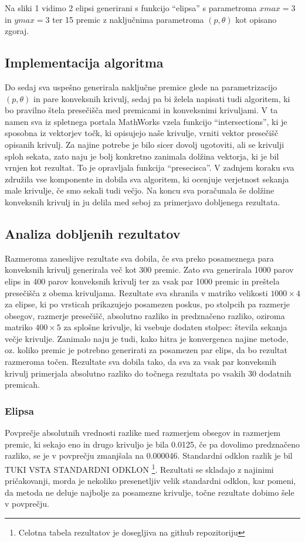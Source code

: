 \documentclass[a4paper]{article}
\begin{document}
Na sliki 1 vidimo 2 elipsi generirani s funkcijo ``elipsa'' s parametroma $xmax=3$ in $ymax=3$ ter 15 premic z naključnima parametroma $(p, \theta)$ kot opisano zgoraj. 


\subsection{Implementacija algoritma}
Do sedaj sva uspešno generirala naključne premice glede na parametrizacijo $(p, \theta)$ in pare konveksnih krivulj, sedaj pa bi želela napisati tudi algoritem, ki bo pravilno štela presečišča med premicami in konveksnimi krivuljami. V ta namen sva iz spletnega portala MathWorks vzela funkcijo ``intersections'', ki je sposobna iz vektorjev točk, ki opisujejo naše krivulje, vrniti vektor presečišč opisanih krivulj. Za najine potrebe je bilo sicer dovolj ugotoviti, ali se krivulji sploh sekata, zato naju je bolj konkretno zanimala dolžina vektorja, ki je bil vrnjen kot rezultat. To je opravljala funkcija ``presecisca''. V zadnjem koraku sva združila vse komponente in dobila sva algoritem, ki ocenjuje verjetnost sekanja male krivulje, če smo sekali tudi večjo. Na koncu sva poračunala še dolžine konveksnih krivulj in ju delila med seboj za primerjavo dobljenega rezultata.

\subsection{Analiza dobljenih rezultatov}
Razmeroma zaneslijve rezultate sva dobila, če sva preko posameznega para konveksnih krivulj generirala več kot 300 premic. Zato sva generirala 1000 parov elips in 400 parov konveksnih krivulj ter za vsak par 1000 premic in preštela presečišča z obema krivuljama. Rezultate sva shranila v matriko velikosti $1000 \times 4$ za elipse, ki po vrsticah prikazujejo posamezen poskus, po stolpcih pa razmerje obsegov, razmerje presečišč, absolutno razliko in predznačeno razliko, oziroma matriko $400 \times 5$ za splošne krivulje, ki vsebuje dodaten stolpec: števila sekanja večje krivulje. 
Zanimalo naju je tudi, kako hitra je konvergenca najine metode, oz. koliko premic je potrebno generirati za posamezen par elips, da bo rezultat razmeroma točen. Rezultate sva dobila tako, da sva za vsak par konveksnih krivulj primerjala absolutno razliko do točnega rezultata po vsakih 30 dodatnih premicah. 


\subsubsection{Elipsa}
Povprečje absolutnih vrednosti razlike med razmerjem obsegov in razmerjem premic, ki sekajo eno in drugo krivuljo je bila 0.0125, če pa dovolimo predznačeno razliko, se je v povprečju zmanjšala na 0.000046. Standardni odklon razlik je bil TUKI VSTA STANDARDNI ODKLON \footnote[1]{Celotna tabela rezultatov je dosegljiva na github repozitoriju}. Rezultati se skladajo z najinimi pričakovanji, morda je nekoliko presenetljiv velik standardni odklon, kar pomeni, da metoda ne deluje najbolje za posamezne krivulje, točne rezultate dobimo šele v povprečju.
\end{document}
